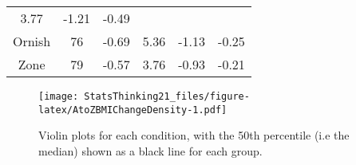 \documentclass[]{book}
\theoremstyle{definition}
\theoremstyle{definition}
\theoremstyle{definition}
\theoremstyle{remark}
\begin{document}
\begin{longtable}[]{@{}cccccc@{}}
\begin{minipage}[t]{0.23\columnwidth}
3.77\strut
\end{minipage} & \begin{minipage}[t]{0.11\columnwidth}\centering\strut
-1.21\strut
\end{minipage} & \begin{minipage}[t]{0.11\columnwidth}\centering\strut
-0.49\strut
\end{minipage}\tabularnewline
\begin{minipage}[t]{0.09\columnwidth}\centering\strut
Ornish\strut
\end{minipage} & \begin{minipage}[t]{0.05\columnwidth}\centering\strut
76\strut
\end{minipage} & \begin{minipage}[t]{0.24\columnwidth}\centering\strut
-0.69\strut
\end{minipage} & \begin{minipage}[t]{0.23\columnwidth}\centering\strut
5.36\strut
\end{minipage} & \begin{minipage}[t]{0.11\columnwidth}\centering\strut
-1.13\strut
\end{minipage} & \begin{minipage}[t]{0.11\columnwidth}\centering\strut
-0.25\strut
\end{minipage}\tabularnewline
\begin{minipage}[t]{0.09\columnwidth}\centering\strut
Zone\strut
\end{minipage} & \begin{minipage}[t]{0.05\columnwidth}\centering\strut
79\strut
\end{minipage} & \begin{minipage}[t]{0.24\columnwidth}\centering\strut
-0.57\strut
\end{minipage} & \begin{minipage}[t]{0.23\columnwidth}\centering\strut
3.76\strut
\end{minipage} & \begin{minipage}[t]{0.11\columnwidth}\centering\strut
-0.93\strut
\end{minipage} & \begin{minipage}[t]{0.11\columnwidth}\centering\strut
-0.21\strut
\end{minipage}\tabularnewline
\bottomrule
\end{longtable}

\begin{figure}
\centering
\texttt{[image: StatsThinking21\_files/figure-latex/AtoZBMIChangeDensity-1.pdf]}
\caption{\label{fig:AtoZBMIChangeDensity}Violin plots for each condition,
with the 50th percentile (i.e the median) shown as a black line for each
group.}
\end{figure}
\end{document}
